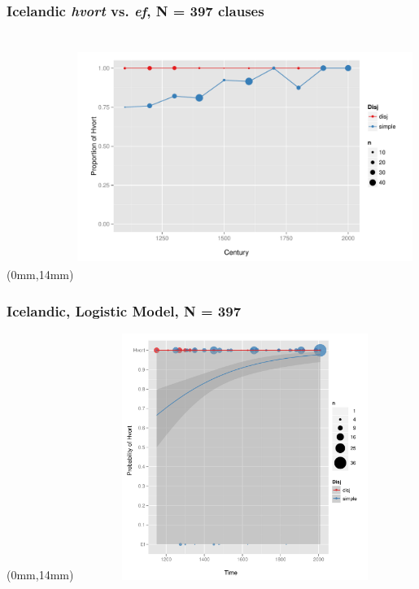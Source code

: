 \documentclass[hyperref={pdfpagelabels=false}]{beamer}
\begin{document}
\begin{frame} 
 \frametitle{Icelandic \textsl{hvort} vs. \textsl{ef}, N = 397 clauses}
\begin{center}
 
 \begin{textblock*}{125mm}(0mm,14mm)
\includegraphics[width=109mm,height=80mm,clip=true,trim=0mm 0mm 0mm 0mm]{whetherifIce.pdf}
\end{textblock*}

\end{center}
\end{frame}

\begin{frame} 
 \frametitle{Icelandic, Logistic Model, N = 397}
 \begin{center}
 \begin{textblock*}{125mm}(0mm,14mm)
\includegraphics[width=109mm,height=80mm,clip=true,trim=0mm 0mm 0mm 0mm]{whetherifIcemodel.pdf}
\end{textblock*}
 \end{center}
\end{frame}
\end{document}
